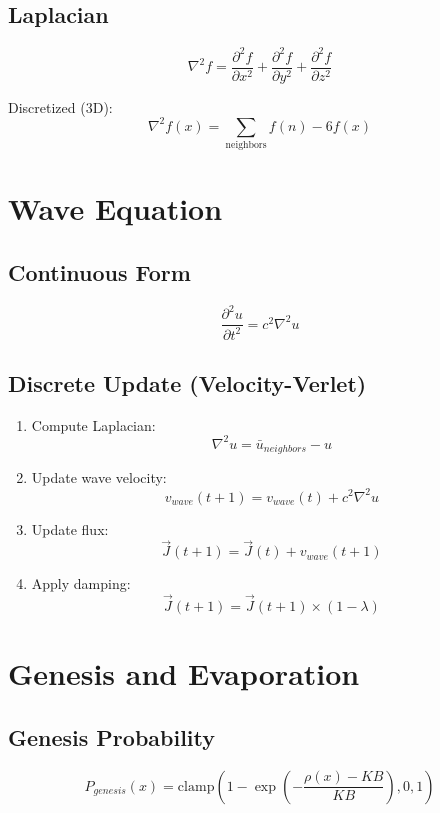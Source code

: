 \documentclass[
  11pt,
  letterpaper,
  twoside,
  openright]{book}
\begin{document}
\subsection{Laplacian}\label{laplacian}

\[
\nabla^2 f = \frac{\partial^2 f}{\partial x^2} + \frac{\partial^2 f}{\partial y^2} + \frac{\partial^2 f}{\partial z^2}
\]

Discretized (3D): \[
\nabla^2 f(x) = \sum_{\text{neighbors}} f(n) - 6f(x)
\]

\section{Wave Equation}\label{wave-equation}

\subsection{Continuous Form}\label{continuous-form}

\[
\frac{\partial^2 u}{\partial t^2} = c^2 \nabla^2 u
\]

\subsection{Discrete Update
(Velocity-Verlet)}\label{discrete-update-velocity-verlet}

\begin{enumerate}
\def\labelenumi{\arabic{enumi}.}
\item
  Compute Laplacian: \[
  \nabla^2 u = \bar{u}_{neighbors} - u
  \]
\item
  Update wave velocity: \[
  v_{wave}(t+1) = v_{wave}(t) + c^2 \nabla^2 u
  \]
\item
  Update flux: \[
  \vec{J}(t+1) = \vec{J}(t) + v_{wave}(t+1)
  \]
\item
  Apply damping: \[
  \vec{J}(t+1) = \vec{J}(t+1) \times (1 - \lambda)
  \]
\end{enumerate}

\section{Genesis and Evaporation}\label{genesis-and-evaporation}

\subsection{Genesis Probability}\label{genesis-probability}

\[
P_{genesis}(x) = \text{clamp}\left(1 - \exp\left(-\frac{\rho(x) - KB}{KB}\right), 0, 1\right)
\]
\end{document}
